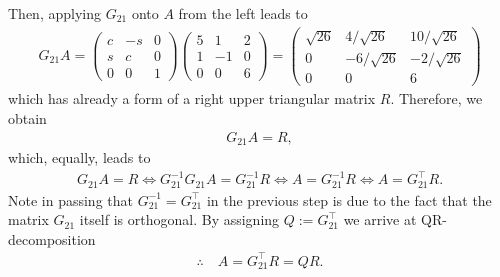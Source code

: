 \documentclass[12pt]{article}
\begin{document}
Then, applying $G_{21}$ onto $A$ from the left leads to 
\begin{align}
	G_{21}A = 
	\begin{pmatrix}  c &-s &0 \\ s &c &0 \\ 0 &0 &1 \end{pmatrix}
	\begin{pmatrix} 5 &1 &2 \\ 1 &-1 &0 \\ 0 &0 &6 \end{pmatrix}
	= \begin{pmatrix} \sqrt{26} &4/\sqrt{26} &10/\sqrt{26} \\ 0 &-6/\sqrt{26} &-2/\sqrt{26} \\ 0 &0 &6 \end{pmatrix}
\end{align}
which has already a form of a right upper triangular matrix $R$. Therefore, we obtain
\begin{align}
	G_{21}A = R,
\end{align}
which, equally, leads to 
\begin{align}
	G_{21}A = R 
	\Leftrightarrow
	G_{21}^{-1}G_{21}A = G_{21}^{-1}R
	\Leftrightarrow
	A = G_{21}^{-1}R
	\Leftrightarrow
	A = G_{21}^{\top}R.
\end{align}
Note in passing that $G_{21}^{-1} = G_{21}^{\top}$ in the previous step is due to the fact 
that the matrix $G_{21}$ itself is orthogonal. 
By assigning $Q:=G_{21}^{\top}$ we arrive at QR-decomposition
\begin{align*}
	\therefore\quad\boxed{
		A = G_{21}^{\top}R = QR.
	}
\end{align*}
\end{document}
